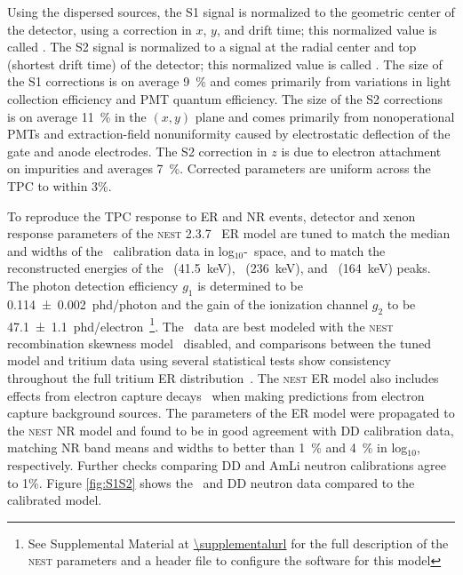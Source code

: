 Using the dispersed sources, the S1 signal is normalized to the geometric center of the detector, using a correction in $x$, $y$, and drift time; this normalized value is called \sonec. The S2 signal is normalized to a signal at the radial center and top (shortest drift time) of the detector; this normalized value is called \stwoc. The size of the S1 corrections is on average \SI{9}{\percent} and comes primarily from variations in light collection efficiency and PMT quantum efficiency. The size of the S2 corrections is on average \SI{11}{\percent} in the $(x, y)$ plane and comes primarily from nonoperational PMTs and extraction-field nonuniformity caused by electrostatic deflection of the gate and anode electrodes. The S2 correction in $z$ is due to electron attachment on impurities and averages \SI{7}{\percent}.  Corrected parameters are uniform across the TPC to within $3$\%. 

To reproduce the TPC response to ER and NR events, detector and xenon response parameters of the \textsc{nest} 2.3.7~\cite{szydagis_m_2022_6534007} ER model are tuned to match the median and widths of the \tritium\ calibration data in log$_{10}$\stwoc-\sonec\, space, and to match the reconstructed energies of the \KrEightThreem~(\SI{41.5}{keV}), \XeOneTwoNinem~(\SI{236}{keV}), and \XeOneThreeOnem~(\SI{164}{keV}) peaks. The photon detection efficiency $g_1$ is determined to be \SI{0.114(2)}{phd/photon} and the gain of the ionization channel $g_2$ to be \SI{47.1(11)}{phd/electron}~\footnote{See Supplemental Material at \url{\supplementalurl} for the full description of the \textsc{nest} parameters and a header file to configure the software for this model}. The \tritium\ data are best modeled with the \textsc{nest} recombination skewness model~\cite{akerib2020discrimination} disabled, and comparisons between the tuned model and tritium data using several statistical tests show consistency throughout the full tritium ER distribution~\cite{kolmogorov1933sulla,smirnov1939estimation, andersondarling, shapiro1965analysis}. The \textsc{nest}  ER model also includes effects from electron capture decays~\cite{temples2021measurement} when making predictions from electron capture background sources. The parameters of the ER model were propagated to the \textsc{nest} NR model and found to be in good agreement with  DD calibration data, matching NR band means and widths to better than \SI{1}{\percent} and \SI{4}{\percent} in log$_{10}$\stwoc, respectively. Further checks comparing DD and AmLi neutron calibrations agree to 1\%. Figure \ref{fig:S1S2} shows the \tritium\ and DD neutron data compared to the calibrated model. 

